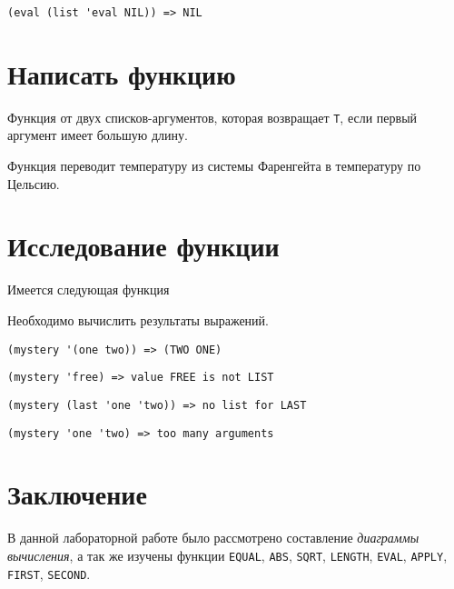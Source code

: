 \problem \hfill
\begin{lstlisting}
(eval (list 'eval NIL)) => NIL
\end{lstlisting}



\section{Написать функцию}

\problem Функция от двух списков-аргументов, которая возвращает \verb|T|, если первый аргумент имеет большую длину.



\problem Функция переводит температуру из системы Фаренгейта в температуру по Цельсию.




\section{Исследование функции}

Имеется следующая функция


\noindent
Необходимо вычислить результаты выражений.


\problem \hfill
\begin{lstlisting}
(mystery '(one two)) => (TWO ONE)
\end{lstlisting}


\problem \hfill
\begin{lstlisting}
(mystery 'free) => value FREE is not LIST
\end{lstlisting}


\problem \hfill
\begin{lstlisting}
(mystery (last 'one 'two)) => no list for LAST
\end{lstlisting}


\problem \hfill
\begin{lstlisting}
(mystery 'one 'two) => too many arguments
\end{lstlisting}



\section{Заключение}

В данной лабораторной работе было рассмотрено составление \textit{диаграммы вычисления}, а так же изучены функции \verb|EQUAL|, \verb|ABS|, \verb|SQRT|, \verb|LENGTH|, \verb|EVAL|, \verb|APPLY|, \verb|FIRST|, \verb|SECOND|.